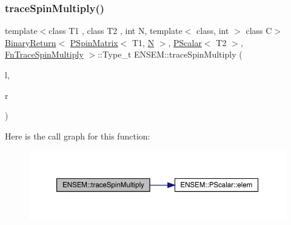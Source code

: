 \subsubsection{\texorpdfstring{traceSpinMultiply()}{traceSpinMultiply()}\hspace{0.1cm}{\footnotesize\ttfamily [2/3]}}
{\footnotesize\ttfamily template$<$class T1 , class T2 , int N, template$<$ class, int $>$ class C$>$ \\
\mbox{\hyperlink{structENSEM_1_1BinaryReturn}{Binary\+Return}}$<$ \mbox{\hyperlink{classENSEM_1_1PSpinMatrix}{P\+Spin\+Matrix}}$<$ T1, \mbox{\hyperlink{operator__name__util_8cc_a7722c8ecbb62d99aee7ce68b1752f337}{N}} $>$, \mbox{\hyperlink{classENSEM_1_1PScalar}{P\+Scalar}}$<$ T2 $>$, \mbox{\hyperlink{structENSEM_1_1FnTraceSpinMultiply}{Fn\+Trace\+Spin\+Multiply}} $>$\+::Type\+\_\+t E\+N\+S\+E\+M\+::trace\+Spin\+Multiply (\begin{DoxyParamCaption}\item[{const \mbox{\hyperlink{classENSEM_1_1PSpinMatrix}{P\+Spin\+Matrix}}$<$ T1, \mbox{\hyperlink{operator__name__util_8cc_a7722c8ecbb62d99aee7ce68b1752f337}{N}} $>$ \&}]{l,  }\item[{const \mbox{\hyperlink{classENSEM_1_1PScalar}{P\+Scalar}}$<$ T2 $>$ \&}]{r }\end{DoxyParamCaption})\hspace{0.3cm}{\ttfamily [inline]}}

Here is the call graph for this function\+:\nopagebreak
\begin{figure}[H]
\begin{center}
\leavevmode
\includegraphics[width=350pt]{d6/df5/group__primspinmatrix_ga397616dd6ad517f1cf893903cd93c2c8_cgraph}
\end{center}
\end{figure}
\mbox{\label{group__primspinmatrix_ga2dc2ab87ff63abab3c74a0a1f1dd3d09}} 
